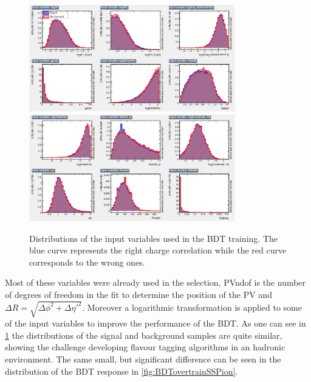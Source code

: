\begin{figure}[tbp]
	\begin{center}
		\includegraphics[width=0.8\textwidth]{08FlavourTagging/figs/SSpionBDT_input1.pdf}\\
		\includegraphics[width=0.8\textwidth]{08FlavourTagging/figs/SSpionBDT_input2.pdf}
	\end{center}
	\caption{Distributions of the input variables used in the BDT training.
	The blue curve represents the right charge correlation while the red curve corresponds to the wrong ones.}
	\label{fig:BDTInputSSPion}
\end{figure}
Most of these variables were already used in the selection, PVndof is the number of degrees of freedom in the fit to determine the position of the \ac{PV} and $\Delta R=\sqrt{\Delta\phi^2+\Delta\eta'^2}$.
Moreover a logarithmic transformation is applied to some of the input variables to improve the performance of the BDT.
As one can see in \cref{fig:BDTInputSSPion} the distributions of the signal and background samples are quite similar, showing the challenge developing flavour tagging algorithms in an hadronic environment.
The same small, but significant difference can be seen in the distribution of the BDT response in \cref{fig:BDTovertrainSSPion}.
